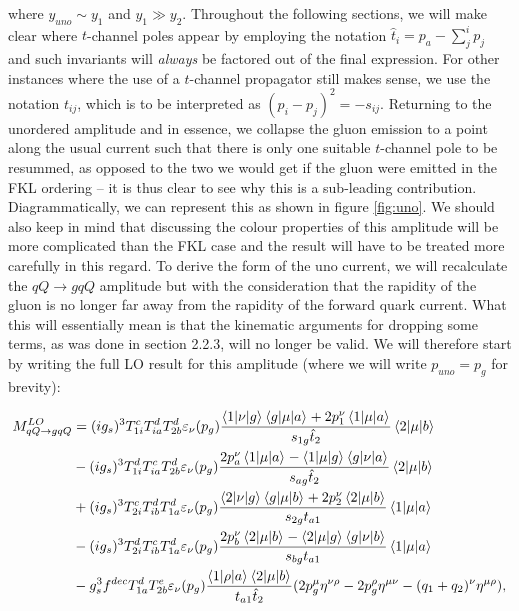 where $y_{uno} \sim y_1$ and $y_1 \gg y_2$. Throughout the following sections, we will make clear where $t$-channel poles appear by employing the notation $\hat{t}_i = p_a - \sum_j^i p_j$ and such invariants will \emph{always} be factored out of the final expression. For other instances where the use of a $t$-channel propagator still makes sense, we use the notation $t_{ij}$, which is to be interpreted as $(p_i-p_j)^2 = -s_{ij}$.  Returning to the unordered amplitude and in essence, we collapse the gluon emission to a point along the usual current such that there is only one suitable $t$-channel pole to be resummed, as opposed to the two we would get if the gluon were emitted in the FKL ordering -- it is thus clear to see why this is a sub-leading contribution. Diagrammatically, we can represent this as shown in figure \ref{fig:uno}. We should also keep in mind that discussing the colour properties of this amplitude will be more complicated than the FKL case and the result will have to be treated more carefully in this regard. To derive the form of the uno current, we will recalculate the $qQ \to gqQ$ amplitude but with the consideration that the rapidity of the gluon is no longer far away from the rapidity of the forward quark current. What this will essentially mean is that the kinematic arguments for dropping some terms, as was done in section 2.2.3, will no longer be valid. We will therefore start by writing the full LO result for this amplitude (where we will write $p_{uno} = p_g$ for brevity):

\begin{equation}
\begin{split}
M_{qQ \to gqQ}^{LO} &= (ig_s)^3 T^c_{1i}T_{ia}^d T^d_{2b} \varepsilon_{\nu}(p_g) \frac{\mathinner{\langle1\vert\nu\vert g\rangle}_{}\mathinner{\langle g\vert\mu\vert a\rangle}_{} + 2p_1^\nu \mathinner{\langle1\vert\mu\vert a\rangle}_{}}{s_{1g}\hat{t}_2}\mathinner{\langle2\vert\mu\vert b\rangle}_{} \\
 &- (ig_s)^3 T^d_{1i}T_{ia}^c T^d_{2b} \varepsilon_{\nu}(p_g) \frac{2p_a^\nu \mathinner{\langle1\vert\mu\vert a\rangle}_{} - \mathinner{\langle1\vert\mu\vert g\rangle}_{}\mathinner{\langle g\vert\nu\vert a\rangle}_{}}{s_{ag}\hat{t}_2}\mathinner{\langle2\vert\mu\vert b\rangle}_{} \\
 &+ (ig_s)^3 T^c_{2i}T_{ib}^d T^d_{1a} \varepsilon_{\nu}(p_g) \frac{\mathinner{\langle2\vert\nu\vert g\rangle}_{}\mathinner{\langle g\vert\mu\vert b\rangle}_{} + 2p_2^\nu \mathinner{\langle2\vert\mu\vert b\rangle}_{}}{s_{2g}t_{a1}}\mathinner{\langle1\vert\mu\vert a\rangle}_{} \\
  &- (ig_s)^3 T^d_{2i}T_{ib}^c T^d_{1a} \varepsilon_{\nu}(p_g) \frac{2p_b^\nu \mathinner{\langle2\vert\mu\vert b\rangle}_{} - \mathinner{\langle2\vert\mu\vert g\rangle}_{}\mathinner{\langle g\vert\nu\vert b\rangle}_{}}{s_{bg}t_{a1}}\mathinner{\langle1\vert\mu\vert a\rangle}_{} \\
  &-g_s^3 f^{dec}T^d_{1a}T^e_{2b} \varepsilon_\nu(p_g) \frac{\mathinner{\langle1\vert\rho\vert a\rangle}_{}\mathinner{\langle2\vert\mu\vert b\rangle}_{}}{t_{a1} \hat{t}_2}(2p_g^\mu \eta^{\nu \rho} - 2p_g^\rho \eta^{\mu \nu} - (q_1 + q_2)^\nu \eta^{\mu \rho}),
\end{split}
\end{equation}

